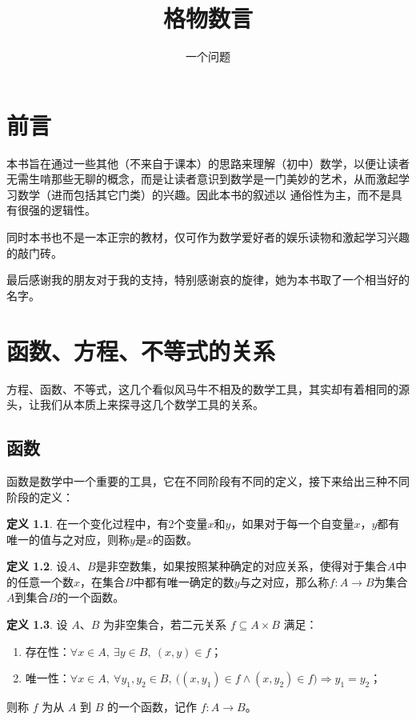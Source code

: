 \documentclass[a4paper,12pt]{ctexbook}
\title{格物数言}
\author{一个问题}
\date{}
\theoremstyle{definition}
\newtheorem{definition}{定义}[chapter]
\theoremstyle{plain}
\theoremstyle{remark}
\begin{document}
\maketitle

\frontmatter

\chapter*{前言}

本书旨在通过一些其他（不来自于课本）的思路来理解（初中）数学，以便让读者无需生啃那些无聊的概念，而是让读者意识到数学是一门美妙的艺术，从而激起学习数学（进而包括其它门类）的兴趣。因此本书的叙述以
通俗性为主，而不是具有很强的逻辑性。

同时本书也不是一本正宗的教材，仅可作为数学爱好者的娱乐读物和激起学习兴趣的敲门砖。

最后感谢我的朋友对于我的支持，特别感谢哀的旋律，她为本书取了一个相当好的名字。

\tableofcontents

\mainmatter

\chapter{函数、方程、不等式的关系}

方程、函数、不等式，这几个看似风马牛不相及的数学工具，其实却有着相同的源头，让我们从本质上来探寻这几个数学工具的关系。

\section{函数}
函数是数学中一个重要的工具，它在不同阶段有不同的定义，接下来给出三种不同阶段的定义：

\begin{definition}
在一个变化过程中，有2个变量$x$和$y$，如果对于每一个自变量$x$，$y$都有唯一的值与之对应，则称$y$是$x$的函数。
\end{definition}

\begin{definition}
设$A$、$B$是非空数集，如果按照某种确定的对应关系，使得对于集合$A$中的任意一个数$x$，在集合$B$中都有唯一确定的数$y$与之对应，那么称$f:A \to B$为集合$A$到集合$B$的一个函数。
\end{definition}

\begin{definition}
设 $A$、$B$ 为非空集合，若二元关系 $f \subseteq A \times B$ 满足：
\begin{enumerate}
\item 存在性：$\forall x \in A,\ \exists y \in B,\ (x,y) \in f$；
\item 唯一性：$\forall x \in A,\ \forall y_1, y_2 \in B,\ 
\bigl((x,y_1) \in f \land (x,y_2) \in f\bigr) \Rightarrow y_1 = y_2$；
\end{enumerate}
则称 $f$ 为从 $A$ 到 $B$ 的一个函数，记作 $f: A \to B$。
\end{definition}
\end{document}
